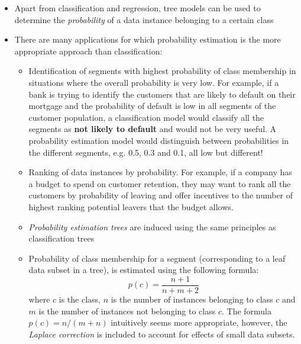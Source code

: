 \begin{itemize}
\item Apart from classification and regression, tree models can be used to determine the \emph{probability} of a data instance belonging to a certain class
\item There are many applications for which probability estimation is the more appropriate approach than classification:
  \begin{itemize}
  \item Identification of segments with highest probability of class membership in situations where the overall probability is very low. For example, if a bank is trying to identify the customers that are likely to default on their mortgage and the probability of default is low in all segments of the customer population, a classification model would classify all the segments as \textbf{not likely to default} and would not be very useful. A probability estimation model would distinguish between probabilities in the different segments, e.g. 0.5, 0.3 and 0.1, all low but different!
  \item Ranking of data instances by probability. For example, if a company has a budget to spend on customer retention, they may want to rank all the customers by probability of leaving and offer incentives to the number of highest ranking potential leavers that the budget allows.
  \item \emph{Probability estimation trees} are induced using the same principles as classification trees
  \item Probability of class membership for a segment (corresponding to a leaf data subset in a tree), is estimated using the following formula:
    $$p(c) = \dfrac{n+1}{n+m+2}$$
    where $c$ is the class, $n$ is the number of instances belonging to class $c$ and $m$ is the number of instances not belonging to class $c$. The formula $p(c)=n/(m+n)$ intuitively seems more appropriate, however, the \emph{Laplace correction} is included to account for effects of small data subsets. 
  \end{itemize}
\end{itemize}

\newpage


